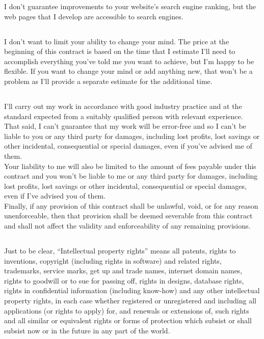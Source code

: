 \documentclass[10px,a4paper]{article}
\begin{document}
I don't guarantee improvements to your website's search engine ranking, but the web pages that I develop are accessible to search engines.

\subsection*{}

I don't want to limit your ability to change your mind. The price at the beginning of this contract is based on the time that I estimate
I'll need to accomplish everything you've told me you want to achieve, but I'm happy to be flexible. If you want to change your mind or add anything new,
that won't be a problem as I'll provide a separate estimate for the additional time.

\subsection*{}

I'll carry out my work in accordance with good industry practice and at the standard expected from a suitably qualified person with relevant experience.\\

That said, I can't guarantee that my work will be error-free and so I can't be liable to you or any third party
for damages, including lost profits, lost savings or other incidental, consequential or special damages,
even if you've advised me of them.\\

Your liability to me will also be limited to the amount of fees payable under this contract and you won't be liable to me or any third party
for damages, including lost profits, lost savings or other incidental, consequential or special damages, even if I've advised you of them.\\

Finally, if any provision of this contract shall be unlawful, void, or for any reason unenforceable, then that provision shall be
deemed severable from this contract and shall not affect the validity and enforceability of any remaining provisions.

\subsection*{}

Just to be clear, \enquote{Intellectual property rights} means all patents, rights to inventions, copyright (including rights in software) and related rights,
trademarks, service marks, get up and trade names, internet domain names, rights to goodwill or to sue for passing off, rights in designs, database rights,
rights in confidential information (including know-how) and any other intellectual property rights, in each case whether registered or unregistered and
including all applications (or rights to apply) for, and renewals or extensions of, such rights and all similar or equivalent rights or forms of protection
which subsist or shall subsist now or in the future in any part of the world.\\
\end{document}
